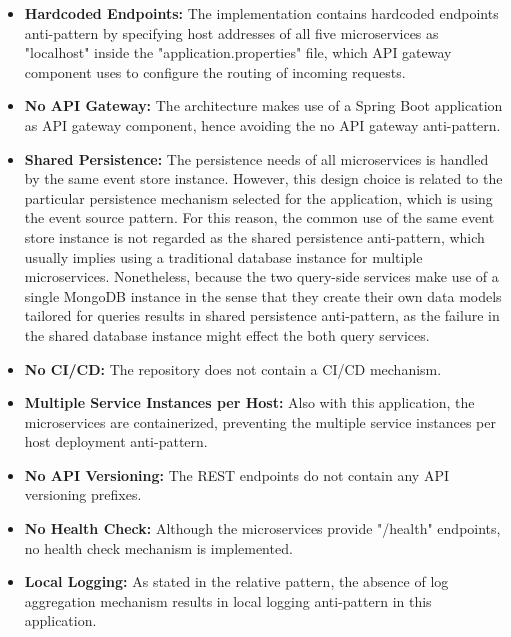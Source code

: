 \documentclass{Configuration_Files/PoliMi3i_thesis}
\begin{document}
\begin{itemize}
    \item \textbf{Hardcoded Endpoints:} The implementation contains hardcoded endpoints anti-pattern by specifying host addresses of all five microservices as "localhost" inside the "application.properties" file, which API gateway component uses to configure the routing of incoming requests.
    
    \item \textbf{No API Gateway:} The architecture makes use of a Spring Boot application as API gateway component, hence avoiding the no API gateway anti-pattern.
    
    \item \textbf{Shared Persistence:} The persistence needs of all microservices is handled by the same event store instance.
    However, this design choice is related to the particular persistence mechanism selected for the application, which is using the event source pattern.
    For this reason, the common use of the same event store instance is not regarded as the shared persistence anti-pattern, which usually implies using a traditional database instance for multiple microservices. 
    Nonetheless, because the two query-side services make use of a single MongoDB instance in the sense that they create their own data models tailored for queries results in shared persistence anti-pattern, as the failure in the shared database instance might effect the both query services.
    
    \item \textbf{No CI/CD:} The repository does not contain a CI/CD mechanism.
    
    \item \textbf{Multiple Service Instances per Host:} Also with this application, the microservices are containerized, preventing the multiple service instances per host deployment anti-pattern.
    
    \item \textbf{No API Versioning:} The REST endpoints do not contain any API versioning prefixes.
    
    \item \textbf{No Health Check:} Although the microservices provide "/health" endpoints, no health check mechanism is implemented.
    
    \item \textbf{Local Logging:} As stated in the relative pattern, the absence of log aggregation mechanism results in local logging anti-pattern in this application.
\end{itemize}
\end{document}
